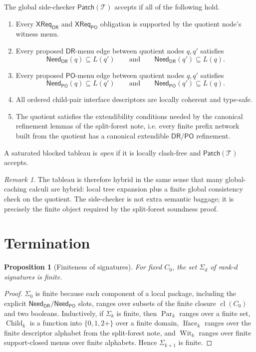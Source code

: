 \documentclass[11pt]{article}
\newtheorem{proposition}[definition]{Proposition}
\theoremstyle{remark}
\newtheorem{remark}[definition]{Remark}
\newcommand{\DR}{\mathsf{DR}}
\newcommand{\PO}{\mathsf{PO}}
\newcommand{\cl}{\operatorname{cl}}
\newcommand{\Par}{\operatorname{Par}}
\newcommand{\Child}{\operatorname{Child}}
\newcommand{\Iface}{\operatorname{Iface}}
\newcommand{\Wit}{\operatorname{Wit}}
\newcommand{\CrossDR}{\mathsf{XReq}_{\DR}}
\newcommand{\CrossPO}{\mathsf{XReq}_{\PO}}
\newcommand{\NeedDR}{\mathsf{Need}_{\DR}}
\newcommand{\NeedPO}{\mathsf{Need}_{\PO}}
\begin{document}
The global side-checker $\mathsf{Patch}(\mathcal T)$ accepts if all of the following hold.
\begin{enumerate}[label=(\roman*)]
    \item Every $\CrossDR$ and $\CrossPO$ obligation is supported by the quotient node's witness menu.
    \item Every proposed $\DR$-menu edge between quotient nodes $q,q'$ satisfies
    \[
    \NeedDR(q)\subseteq L(q')
    \qquad\text{and}\qquad
    \NeedDR(q')\subseteq L(q).
    \]
    \item Every proposed $\PO$-menu edge between quotient nodes $q,q'$ satisfies
    \[
    \NeedPO(q)\subseteq L(q')
    \qquad\text{and}\qquad
    \NeedPO(q')\subseteq L(q).
    \]
    \item All ordered child-pair interface descriptors are locally coherent and type-safe.
    \item The quotient satisfies the extendibility conditions needed by the canonical refinement lemmas of the split-forest note, i.e. every finite prefix network built from the quotient has a canonical extendible $\DR/\PO$ refinement.
\end{enumerate}
A saturated blocked tableau is \emph{open} if it is locally clash-free and $\mathsf{Patch}(\mathcal T)$ accepts.

\begin{remark}
The tableau is therefore hybrid in the same sense that many global-caching calculi are hybrid: local tree expansion plus a finite global consistency check on the quotient. The side-checker is not extra semantic baggage; it is precisely the finite object required by the split-forest soundness proof.
\end{remark}

\section{Termination}

\begin{proposition}[Finiteness of signatures]\label{prop:finitely-many-signatures}
For fixed $C_0$, the set $\Sigma_d$ of rank-$d$ signatures is finite.
\end{proposition}

\begin{proof}
$\Sigma_0$ is finite because each component of a local package, including the explicit $\NeedDR/\NeedPO$ slots, ranges over subsets of the finite closure $\cl(C_0)$ and two booleans. Inductively, if $\Sigma_k$ is finite, then $\Par_k$ ranges over a finite set, $\Child_k$ is a function into $\{0,1,2+\}$ over a finite domain, $\Iface_k$ ranges over the finite descriptor alphabet from the split-forest note, and $\Wit_k$ ranges over finite support-closed menus over finite alphabets. Hence $\Sigma_{k+1}$ is finite.
\end{proof}
\end{document}
